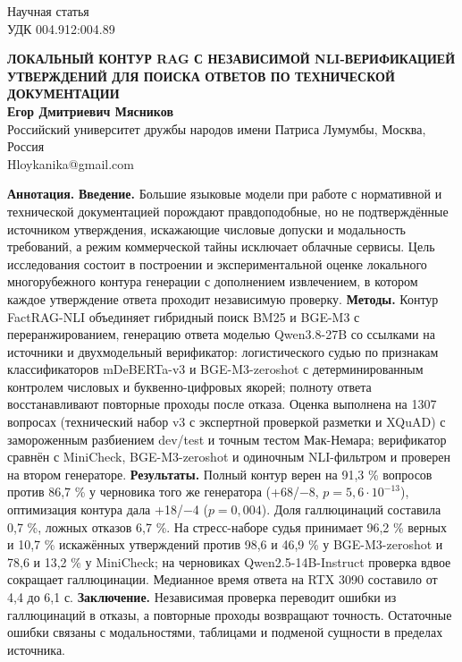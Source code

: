 \documentclass[14pt,a4paper]{extarticle}
\begin{document}
\begin{singlespace*}\small
\noindent Научная статья\\
\noindent УДК 004.912:004.89
\begin{center}\normalsize\textbf{ЛОКАЛЬНЫЙ КОНТУР RAG С НЕЗАВИСИМОЙ NLI-ВЕРИФИКАЦИЕЙ УТВЕРЖДЕНИЙ ДЛЯ ПОИСКА ОТВЕТОВ ПО ТЕХНИЧЕСКОЙ ДОКУМЕНТАЦИИ}\\[12pt]
\small\textbf{Егор Дмитриевич Мясников}\\
Российский университет дружбы народов имени Патриса Лумумбы, Москва, Россия\\Hloykanika@gmail.com\end{center}
\textbf{Аннотация.} \textbf{Введение.} Большие языковые модели при работе с нормативной и технической документацией порождают правдоподобные, но не подтверждённые источником утверждения, искажающие числовые допуски и модальность требований, а режим коммерческой тайны исключает облачные сервисы. Цель исследования состоит в построении и экспериментальной оценке локального многорубежного контура генерации с дополнением извлечением, в котором каждое утверждение ответа проходит независимую проверку. \textbf{Методы.} Контур FactRAG-NLI объединяет гибридный поиск BM25 и BGE-M3 с переранжированием, генерацию ответа моделью Qwen3.8-27B со ссылками на источники и двухмодельный верификатор: логистического судью по признакам классификаторов mDeBERTa-v3 и BGE-M3-zeroshot с детерминированным контролем числовых и буквенно-цифровых якорей; полноту ответа восстанавливают повторные проходы после отказа. Оценка выполнена на 1307 вопросах (технический набор v3 с экспертной проверкой разметки и XQuAD) с замороженным разбиением dev/test и точным тестом Мак-Немара; верификатор сравнён с MiniCheck, BGE-M3-zeroshot и одиночным NLI-фильтром и проверен на втором генераторе. \textbf{Результаты.} Полный контур верен на 91,3 \% вопросов против 86,7 \% у черновика того же генератора (+68/−8, $p = 5{,}6 \cdot 10^{-13}$), оптимизация контура дала +18/−4 ($p = 0{,}004$). Доля галлюцинаций составила 0,7 \%, ложных отказов 6,7 \%. На стресс-наборе судья принимает 96,2 \% верных и 10,7 \% искажённых утверждений против 98,6 и 46,9 \% у BGE-M3-zeroshot и 78,6 и 13,2 \% у MiniCheck; на черновиках Qwen2.5-14B-Instruct проверка вдвое сокращает галлюцинации. Медианное время ответа на RTX 3090 составило от 4,4 до 6,1 с. \textbf{Заключение.} Независимая проверка переводит ошибки из галлюцинаций в отказы, а повторные проходы возвращают точность. Остаточные ошибки связаны с модальностями, таблицами и подменой сущности в пределах источника.


\end{singlespace*}
\end{document}
